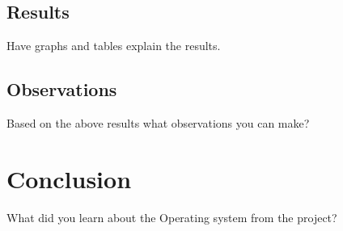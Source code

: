 \documentclass[letterpaper,twocolumn,10pt]{article}
\begin{document}
\subsection{Results}
Have graphs and tables explain the results.

\subsection{Observations}
Based on the above results what observations you can make?

\section{Conclusion}
What did you learn about the Operating system from the project?

{\footnotesize 
}
\end{document}
